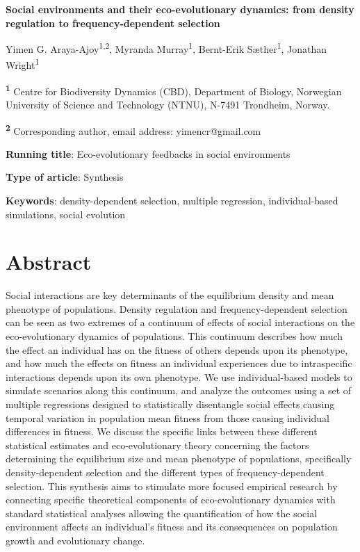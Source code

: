 \documentclass{article}
\begin{document}
\begin{center}
\large
\textbf{Social environments and their eco-evolutionary dynamics: from density regulation to frequency-dependent selection}
\end{center}

\begin{center}
	Yimen G. Araya-Ajoy\textsuperscript{1,2}, Myranda Murray\textsuperscript{1},  Bernt-Erik Sæther\textsuperscript{1}, Jonathan Wright\textsuperscript{1}
\end{center}

\bigskip
\noindent \textsuperscript{\textbf{1}} Centre for Biodiversity Dynamics (CBD), Department of Biology, Norwegian University of Science and Technology (NTNU), N-7491 Trondheim, Norway.

\noindent \textsuperscript{\textbf{2}} Corresponding author, email address: yimencr@gmail.com

\bigskip
\noindent \textbf{Running title}:  Eco-evolutionary feedbacks in social environments 

\bigskip
\noindent \textbf{Type of article}: Synthesis

\bigskip
\noindent \textbf{Keywords}: density-dependent selection, multiple regression, individual-based simulations, social evolution


\newpage
\section{Abstract}
Social interactions are key determinants of the equilibrium density and mean phenotype of populations. Density regulation and frequency-dependent selection can be seen as two extremes of a continuum of effects of social interactions on the eco-evolutionary dynamics of populations. This continuum  describes how much the effect an individual has on the fitness of others depends upon its phenotype, and how much the effects on fitness an individual experiences due to intraspecific interactions depends upon its own phenotype. We use individual-based models to simulate scenarios along this continuum, and analyze the outcomes using a set of multiple regressions designed to statistically disentangle social effects causing temporal variation in population mean fitness from those causing individual differences in fitness. We discuss the specific links between these different statistical estimates and eco-evolutionary theory concerning the factors determining the equilibrium size and mean phenotype of populations, specifically density-dependent selection and the different types of frequency-dependent selection. This synthesis aims to stimulate more focused empirical research by connecting specific theoretical components of eco-evolutionary dynamics with standard statistical analyses allowing the quantification of how the social environment affects an individual's fitness and its consequences on population growth and evolutionary change. 
\end{document}
